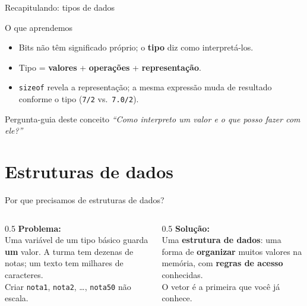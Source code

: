 \documentclass[aspectratio=169]{beamer}
\begin{document}
\begin{frame}{Recapitulando: tipos de dados}
  \begin{block}{O que aprendemos}
    \begin{itemize}
      \item Bits não têm significado próprio; o \textbf{tipo} diz como
        interpretá-los.
      \item Tipo = \textbf{valores} + \textbf{operações} +
        \textbf{representação}.
      \item \texttt{sizeof} revela a representação; a mesma expressão muda de
        resultado conforme o tipo (\texttt{7/2} vs.\ \texttt{7.0/2}).
    \end{itemize}
  \end{block}
  \begin{exampleblock}{Pergunta-guia deste conceito}
    \emph{``Como interpreto um valor e o que posso fazer com ele?''}
  \end{exampleblock}
\end{frame}

\section{Estruturas de dados}

\begin{frame}{Por que precisamos de estruturas de dados?}
  \begin{columns}[T]
    \begin{column}{0.5\textwidth}
      \textbf{Problema:}\\[4pt]
      Uma variável de um tipo básico guarda \textbf{um} valor. A turma tem
      dezenas de notas; um texto tem milhares de caracteres.\\[4pt]
      Criar \texttt{nota1}, \texttt{nota2}, \dots, \texttt{nota50} não
      escala.
    \end{column}
    \begin{column}{0.5\textwidth}
      \textbf{Solução:}\\[4pt]
      Uma \textbf{estrutura de dados}: uma forma de \textbf{organizar} muitos
      valores na memória, com \textbf{regras de acesso} conhecidas.\\[4pt]
      O vetor é a primeira que você já conhece.
    \end{column}
  \end{columns}
\end{frame}
\end{document}
